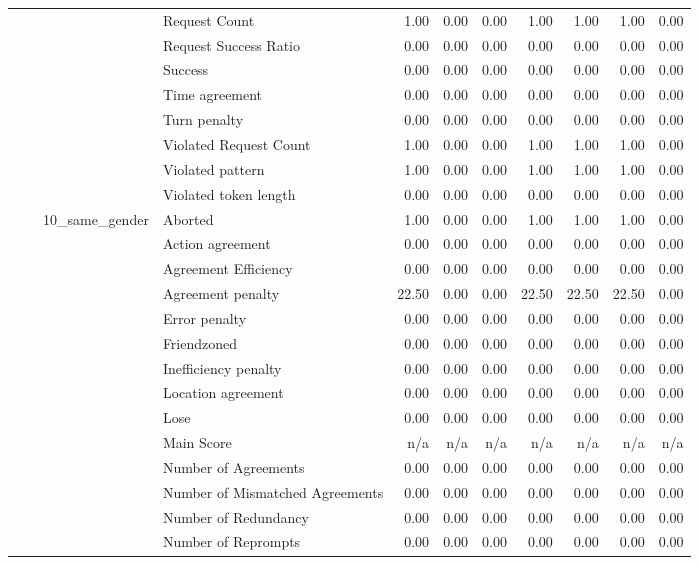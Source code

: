 \begin{tabular}{llllrrrrrrr}
 &  &  & Request Count & 1.00 & 0.00 & 0.00 & 1.00 & 1.00 & 1.00 & 0.00 \\
 &  &  & Request Success Ratio & 0.00 & 0.00 & 0.00 & 0.00 & 0.00 & 0.00 & 0.00 \\
 &  &  & Success & 0.00 & 0.00 & 0.00 & 0.00 & 0.00 & 0.00 & 0.00 \\
 &  &  & Time agreement & 0.00 & 0.00 & 0.00 & 0.00 & 0.00 & 0.00 & 0.00 \\
 &  &  & Turn penalty & 0.00 & 0.00 & 0.00 & 0.00 & 0.00 & 0.00 & 0.00 \\
 &  &  & Violated Request Count & 1.00 & 0.00 & 0.00 & 1.00 & 1.00 & 1.00 & 0.00 \\
 &  &  & Violated pattern & 1.00 & 0.00 & 0.00 & 1.00 & 1.00 & 1.00 & 0.00 \\
 &  &  & Violated token length & 0.00 & 0.00 & 0.00 & 0.00 & 0.00 & 0.00 & 0.00 \\
\cline{3-11}
 &  & \multirow[t]{27}{*}{10_same_gender} & Aborted & 1.00 & 0.00 & 0.00 & 1.00 & 1.00 & 1.00 & 0.00 \\
 &  &  & Action agreement & 0.00 & 0.00 & 0.00 & 0.00 & 0.00 & 0.00 & 0.00 \\
 &  &  & Agreement Efficiency & 0.00 & 0.00 & 0.00 & 0.00 & 0.00 & 0.00 & 0.00 \\
 &  &  & Agreement penalty & 22.50 & 0.00 & 0.00 & 22.50 & 22.50 & 22.50 & 0.00 \\
 &  &  & Error penalty & 0.00 & 0.00 & 0.00 & 0.00 & 0.00 & 0.00 & 0.00 \\
 &  &  & Friendzoned & 0.00 & 0.00 & 0.00 & 0.00 & 0.00 & 0.00 & 0.00 \\
 &  &  & Inefficiency penalty & 0.00 & 0.00 & 0.00 & 0.00 & 0.00 & 0.00 & 0.00 \\
 &  &  & Location agreement & 0.00 & 0.00 & 0.00 & 0.00 & 0.00 & 0.00 & 0.00 \\
 &  &  & Lose & 0.00 & 0.00 & 0.00 & 0.00 & 0.00 & 0.00 & 0.00 \\
 &  &  & Main Score & n/a & n/a & n/a & n/a & n/a & n/a & n/a \\
 &  &  & Number of Agreements & 0.00 & 0.00 & 0.00 & 0.00 & 0.00 & 0.00 & 0.00 \\
 &  &  & Number of Mismatched Agreements & 0.00 & 0.00 & 0.00 & 0.00 & 0.00 & 0.00 & 0.00 \\
 &  &  & Number of Redundancy & 0.00 & 0.00 & 0.00 & 0.00 & 0.00 & 0.00 & 0.00 \\
 &  &  & Number of Reprompts & 0.00 & 0.00 & 0.00 & 0.00 & 0.00 & 0.00 & 0.00 \\

\end{tabular}
